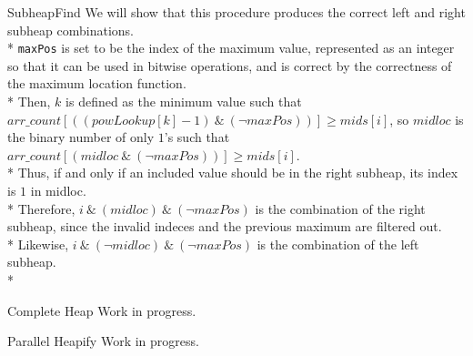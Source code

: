 \documentclass[letterpaper, reqno, 11pt]{article}
\begin{document}
\begin{description}
	\item{SubheapFind}
	We will show that this procedure produces the correct left and right subheap combinations.\\*
	\verb|maxPos| is set to be the index of the maximum value, represented as an integer so that
	it can be used in bitwise operations, and is correct by the correctness of the maximum location
	function.\\*
	Then, $k$ is defined as the minimum value such that
	$arr\_count[((powLookup[k]-1)\ \&\ (\neg maxPos))]\geq mids[i]$,
	so $midloc$ is the binary number of only $1$'s such that
	$arr\_count[(midloc\ \&\ (\neg maxPos))]\geq mids[i]$.\\*
	Thus, if and only if an included value should be in the right subheap, its index is $1$ in midloc.\\*
	Therefore, $i\ \&\ (midloc)\ \&\ (\neg maxPos)$ is the combination of the right subheap, since the
	invalid indeces and the previous maximum are filtered out.\\*
	Likewise, $i\ \&\ (\neg midloc)\ \&\ (\neg maxPos)$ is the combination of the left subheap.\\*

	\item{Complete Heap}
	Work in progress.

	\item{Parallel Heapify}
	Work in progress.

\end{description}
\end{document}
